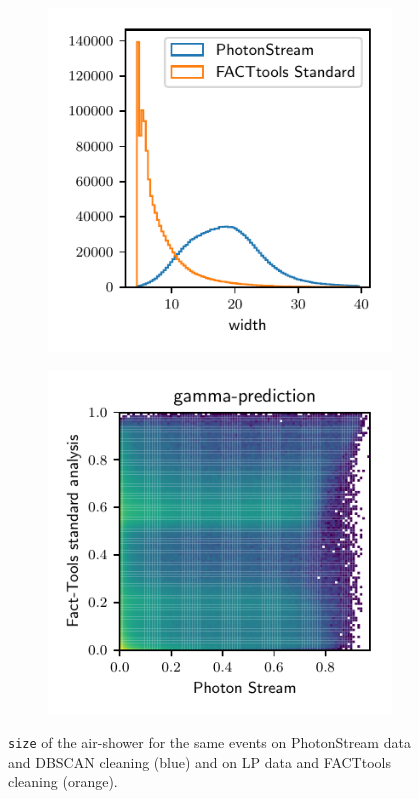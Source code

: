 \begin{figure}
  \begin{subfigure}{0.5\textwidth}
    \centering
  \includegraphics[width=\textwidth, page=5]{Plots/std_phs_comparison_hist_same_DBSCAN_crab.pdf}
  \end{subfigure}
  \begin{subfigure}{0.5\textwidth}
    \centering
    \includegraphics[width=\textwidth, page=5]{Plots/comparison_data_dl3.pdf}
  \end{subfigure}
  \caption{\texttt{size} of the air-shower for the same events on PhotonStream data and DBSCAN cleaning (blue) and on LP data and FACTtools cleaning (orange).}
  \label{fig:size_comp}
\end{figure}
